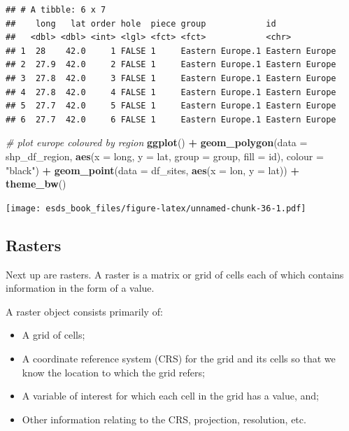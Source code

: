 \documentclass[
]{book}
\newenvironment{Shaded}{\begin{snugshade}}{\end{snugshade}}
\newcommand{\CommentTok}[1]{\textcolor[rgb]{0.56,0.35,0.01}{\textit{#1}}}
\newcommand{\DataTypeTok}[1]{\textcolor[rgb]{0.13,0.29,0.53}{#1}}
\newcommand{\KeywordTok}[1]{\textcolor[rgb]{0.13,0.29,0.53}{\textbf{#1}}}
\newcommand{\NormalTok}[1]{#1}
\newcommand{\OperatorTok}[1]{\textcolor[rgb]{0.81,0.36,0.00}{\textbf{#1}}}
\newcommand{\StringTok}[1]{\textcolor[rgb]{0.31,0.60,0.02}{#1}}
\providecommand{\tightlist}{%
  \setlength{\itemsep}{0pt}\setlength{\parskip}{0pt}}
\begin{document}
\begin{verbatim}
## # A tibble: 6 x 7
##    long   lat order hole  piece group            id            
##   <dbl> <dbl> <int> <lgl> <fct> <fct>            <chr>         
## 1  28    42.0     1 FALSE 1     Eastern Europe.1 Eastern Europe
## 2  27.9  42.0     2 FALSE 1     Eastern Europe.1 Eastern Europe
## 3  27.8  42.0     3 FALSE 1     Eastern Europe.1 Eastern Europe
## 4  27.8  42.0     4 FALSE 1     Eastern Europe.1 Eastern Europe
## 5  27.7  42.0     5 FALSE 1     Eastern Europe.1 Eastern Europe
## 6  27.7  42.0     6 FALSE 1     Eastern Europe.1 Eastern Europe
\end{verbatim}

\begin{Shaded}
\begin{Highlighting}[]
\CommentTok{# plot europe coloured by region}
\KeywordTok{ggplot}\NormalTok{() }\OperatorTok{+}\StringTok{ }
\StringTok{  }\KeywordTok{geom_polygon}\NormalTok{(}\DataTypeTok{data =}\NormalTok{ shp_df_region, }\KeywordTok{aes}\NormalTok{(}\DataTypeTok{x =}\NormalTok{ long, }\DataTypeTok{y =}\NormalTok{ lat, }\DataTypeTok{group =}\NormalTok{ group, }\DataTypeTok{fill =}\NormalTok{ id), }\DataTypeTok{colour =} \StringTok{"black"}\NormalTok{) }\OperatorTok{+}
\StringTok{  }\KeywordTok{geom_point}\NormalTok{(}\DataTypeTok{data =}\NormalTok{ df_sites, }\KeywordTok{aes}\NormalTok{(}\DataTypeTok{x =}\NormalTok{ lon, }\DataTypeTok{y =}\NormalTok{ lat)) }\OperatorTok{+}
\StringTok{  }\KeywordTok{theme_bw}\NormalTok{()}
\end{Highlighting}
\end{Shaded}

\texttt{[image: esds\_book\_files/figure-latex/unnamed-chunk-36-1.pdf]}

\hypertarget{rasters}{%
\subsection{Rasters}\label{rasters}}

Next up are rasters. A raster is a matrix or grid of cells each of which contains information in the form of a value.

A raster object consists primarily of:

\begin{itemize}
\tightlist
\item
  A grid of cells;\\
\item
  A coordinate reference system (CRS) for the grid and its cells so that we know the location to which the grid refers;
\item
  A variable of interest for which each cell in the grid has a value, and;
\item
  Other information relating to the CRS, projection, resolution, etc.
\end{itemize}
\end{document}
